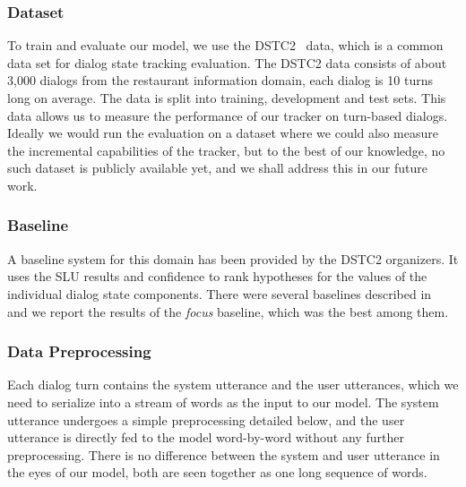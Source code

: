 \documentclass[10pt,twocolumn]{article}
\begin{document}
\subsubsection{Dataset}
To train and evaluate our model, we use the DSTC2~\cite{henderson2014second} data, which is a common data set for dialog state tracking evaluation. The DSTC2 data consists of about 3,000 dialogs from the restaurant information domain, each dialog is 10 turns long on average. The data is split into training, development and test sets. This data allows us to measure the performance of our tracker on turn-based dialogs. Ideally we would run the evaluation on a dataset where we could also measure the incremental capabilities of the tracker, but to the best of our knowledge, no such dataset is publicly available yet, and we shall address this in our future work.

\subsubsection{Baseline}
A baseline system for this domain has been provided by the DSTC2 organizers. It uses the SLU results and confidence to rank hypotheses for the values of the individual dialog state components. There were several baselines described in~\cite{henderson2014second} and we report the results of the \emph{focus} baseline, which was the best among them.

\subsubsection{Data Preprocessing}
Each dialog turn contains the system utterance and the user utterances, which we need to serialize into a stream of words as the input to our model. The system utterance undergoes a simple preprocessing detailed below, and the user utterance is directly fed to the model word-by-word without any further preprocessing. There is no difference between the system and user utterance in the eyes of our model, both are seen together as one long sequence of words.
\end{document}
